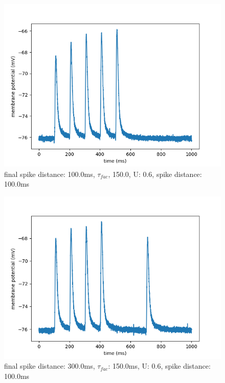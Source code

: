 \documentclass[10pt,a4paper]{scrartcl}
\begin{document}
\begin{figure} [ht]
\begin{center}
\label{fig:abb24}
\caption{final spike distance: 100.0ms, $\tau_{fac}$, 150.0, U: 0.6, spike distance: 100.0ms}
\includegraphics[scale=0.35]{pictures/final_spike_variation_14.pdf} 
\end{center}
\end{figure}

\begin{figure} [ht]
\begin{center}
\label{fig:abb25}
\caption{final spike distance: 300.0ms, $\tau_{fac}$: 150.0ms, U: 0.6, spike distance: 100.0ms}
\includegraphics[scale=0.35]{pictures/final_spike_variation_15.pdf} 
\end{center}
\end{figure}
\end{document}
